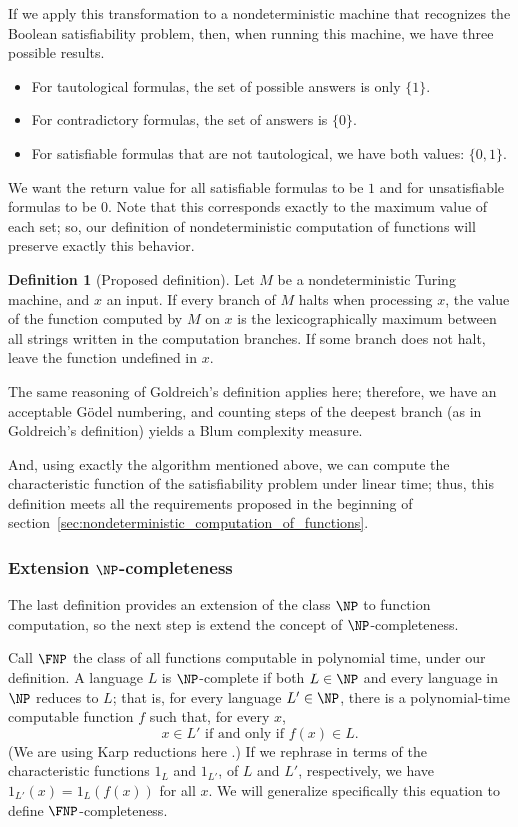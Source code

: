 \documentclass[12pt]{article}
\theoremstyle{definition}
\newtheorem{definition}{Definition}
\begin{document}
If we apply this transformation to a nondeterministic machine
that recognizes the Boolean satisfiability problem,
then, when running this machine,
we have three possible results.
\begin{itemize}
    \item For tautological formulas,
        the set of possible answers is only $\{1\}$.
    \item For contradictory formulas,
        the set of answers is $\{0\}$.
    \item For satisfiable formulas that are not tautological,
        we have both values: $\{0, 1\}$.
\end{itemize}
We want the return value for all satisfiable formulas to be $1$
and for unsatisfiable formulas to be $0$.
Note that this corresponds exactly to the maximum value of each set;
so,
our definition of nondeterministic computation of functions
will preserve exactly this behavior.

\begin{definition}[Proposed definition]
    Let $M$ be a nondeterministic Turing machine,
    and $x$ an input.
    If every branch of $M$ halts when processing $x$,
    the value of the function computed by $M$ on $x$
    is the lexicographically maximum
    between all strings written in the computation branches.
    If some branch does not halt, leave the function undefined in $x$.
\end{definition}

The same reasoning of Goldreich's definition applies here;
therefore, we have an acceptable Gödel numbering,
and counting steps of the deepest branch
(as in Goldreich's definition)
yields a Blum complexity measure.

And, using exactly the algorithm mentioned above,
we can compute the characteristic function of the satisfiability problem
under linear time;
thus, this definition meets all the requirements
proposed in the beginning of section~\ref{sec:nondeterministic_computation_of_functions}.

\subsubsection{Extension $\NP$-completeness}
\label{sec:np-completeness-extension}

The last definition provides an extension of the class $\NP$ to function computation,
so the next step is extend the concept of $\NP$-completeness.

Call $\FNP$ the class of all functions computable in polynomial time,
under our definition.
A language $L$ is $\NP$-complete if both $L \in \NP$
and every language in $\NP$ reduces to $L$;
that is, for every language $L' \in \NP$,
there is a polynomial-time computable function $f$
such that, for every $x$,
\begin{equation*}
    x \in L' \text{ if and only if } f(x) \in L.
\end{equation*}
(We are using Karp reductions here \cite[p.~42]{AroraBarak2009}.)
If we rephrase in terms of the characteristic functions $1_L$ and $1_{L'}$,
of $L$ and $L'$, respectively,
we have $1_{L'}(x) = 1_L(f(x))$ for all $x$.
We will generalize specifically this equation to define $\FNP$-completeness.
\end{document}
